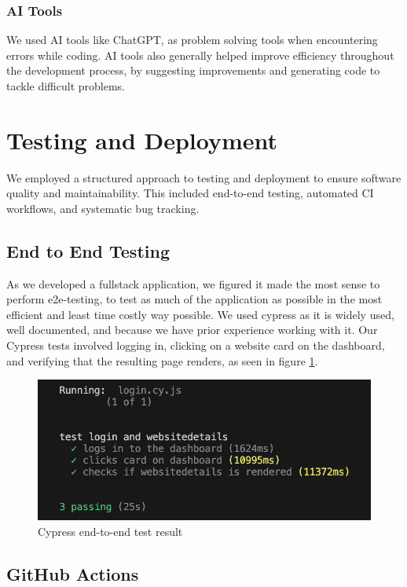 \subsubsection{AI Tools}
We used AI tools like ChatGPT, as problem solving tools when encountering errors while coding.
AI tools also generally helped improve efficiency throughout the development process, by suggesting improvements and generating code to tackle difficult problems.

\section{Testing and Deployment}
\label{sec:testing_deployment}
We employed a structured approach to testing and deployment to ensure software quality and maintainability. This included end-to-end testing, automated CI workflows, and systematic bug tracking.


\subsection{End to End Testing}

As we developed a \gls{fullstack} application, we figured it made the most sense to perform \gls{e2e-testing}, to test as much of the application as possible in the most efficient and least time costly way possible. We used \gls{cypress} as it is widely used, well documented, and because we have prior experience working with it. Our Cypress tests involved logging in, clicking on a website card on the dashboard, and verifying that the resulting page renders, as seen in figure \ref{fig:cypress_test}.



\begin{figure}[H]
    \centering
    \includegraphics[width=0.5\linewidth]{figures/cypress_test.png}
    \caption{Cypress end-to-end test result}
    \label{fig:cypress_test}
\end{figure}

\subsection{GitHub Actions}

